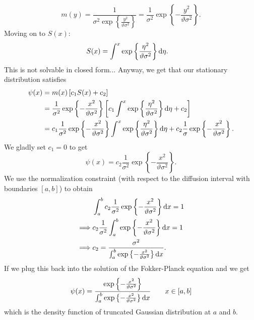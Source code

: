 \documentclass[12pt]{article}
\begin{document}
\begin{enumerate}
\begin{equation*}
		m(y)=\frac{1}{\sigma^{2}\exp\left\{\frac{y^{2}}{\vartheta\sigma^{2}}\right\}}=\frac{1}{\sigma^{2}}\exp\left\{-\frac{y^{2}}{\vartheta\sigma^{2}}\right\}.
	\end{equation*}
	Moving on to $S(x)$:
	\begin{align*}
		S(x)&=\int^{x}\exp\left\{\frac{\eta^{2}}{\vartheta\sigma^{2}}\right\}\mathop{}\!\mathrm{d}\eta.
	\end{align*}
	This is not solvable in closed form... Anyway, we get that our stationary distribution satisfies
	\begin{align*}
		\psi(x)&=m(x)\left[c_{1}S(x)+c_{2}\right]\\
		&=\frac{1}{\sigma^{2}}\exp\left\{-\frac{x^{2}}{\vartheta\sigma^{2}}\right\}\left[c_1\int^{x}\exp\left\{\frac{\eta^{2}}{\vartheta\sigma^{2}}\right\}\mathop{}\!\mathrm{d}\eta+c_2\right]\\
		&=c_1\frac{1}{\sigma^{2}}\exp\left\{-\frac{x^{2}}{\vartheta\sigma^{2}}\right\}\int^{x}\exp\left\{\frac{\eta^{2}}{\vartheta\sigma^{2}}\right\}\mathop{}\!\mathrm{d}\eta+c_2\frac{1}{\sigma}\exp\left\{-\frac{x^{2}}{\vartheta\sigma^{2}}\right\}.
	\end{align*}
	We gladly set $c_1=0$ to get
	\begin{equation*}
		\psi(x)=c_2\frac{1}{\sigma^{2}}\exp\left\{-\frac{x^{2}}{\vartheta\sigma^{2}}\right\}.
	\end{equation*}
	We use the normalization constraint (with respect to the diffusion interval with boundaries $[a,b]$) to obtain
	\begin{align*}
		&\int_{a}^{b}c_2\frac{1}{\sigma^{2}}\exp\left\{-\frac{x^{2}}{\vartheta\sigma^{2}}\right\}\mathop{}\!\mathrm{d} x=1\\
		\implies&c_2\frac{1}{\sigma^{2}}\int_{a}^{b}\exp\left\{-\frac{x^{2}}{\vartheta\sigma^{2}}\right\}\mathop{}\!\mathrm{d} x=1\\
		\implies&c_2=\frac{\sigma^{2}}{\int_{a}^{b}\exp\left\{-\frac{x^{2}}{\vartheta\sigma^{2}}\right\}\mathop{}\!\mathrm{d} x}.
	\end{align*}
	If we plug this back into the solution of the Fokker-Planck equation and we get
	\begin{equation*}
		\psi(x)=\frac{\exp\left\{-\frac{x^{2}}{\vartheta\sigma^{2}}\right\}}{\int_{a}^{b}\exp\left\{-\frac{x^{2}}{\vartheta\sigma^{2}}\right\}\mathop{}\!\mathrm{d} x}\qquad x\in[a,b]
	\end{equation*}
	which is the density function of truncated Gaussian distribution at $a$ and $b$.
	

\end{enumerate}
\end{document}
